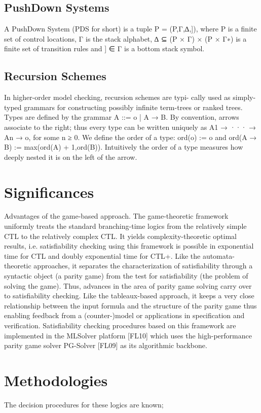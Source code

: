 \documentclass[12pt,letterpaper]{article}
\begin{document}
{\subsection{ PushDown Systems}
A PushDown System (PDS for short) is a tuple P = (P,Γ,∆,]), where P is a ﬁnite set of control locations, Γ is the stack alphabet, ∆ ⊆ (P × Γ) × (P × Γ∗) is a ﬁnite set of transition rules and ] ∈ Γ is a bottom stack symbol.
\subsection{Recursion Schemes}
In higher-order model checking, recursion schemes are typi- cally used as simply-typed grammars for constructing possibly inﬁnite term-trees or ranked trees. Types are deﬁned by the grammar A ::= o | A → B. By convention, arrows associate to the right; thus every type can be written uniquely as A1 → ··· → An → o, for some n ≥ 0. We deﬁne the order of a type: ord(o) := o and ord(A → B) := max(ord(A) + 1,ord(B)). Intuitively the order of a type measures how deeply nested it is on the left of the arrow. 

\section{Significances}
Advantages of the game-based approach. The game-theoretic framework uniformly treats the standard branching-time logics from the relatively simple CTL to the relatively complex CTL.
 It yields complexity-theoretic optimal results, i.e. satisfiability checking using this framework
is possible in exponential time for CTL and doubly exponential time for CTL+.
 Like the automata-theoretic approaches, it separates the characterization of satisfiability
through a syntactic object (a parity game) from the test for satisfiability (the problem
of solving the game). Thus, advances in the area of parity game solving carry over to
satisfiability checking. Like the tableaux-based approach, it keeps a very close relationship between the input formula and the structure of the parity game thus enabling feedback from a (counter-)model or applications in specification and verification. Satisfiability checking procedures based on this framework are implemented in the
MLSolver platform [FL10] which uses the high-performance parity game solver PG-Solver [FL09] as its algorithmic backbone.

\section{Methodologies}
The decision procedures for these logics are known;
}
\end{document}
